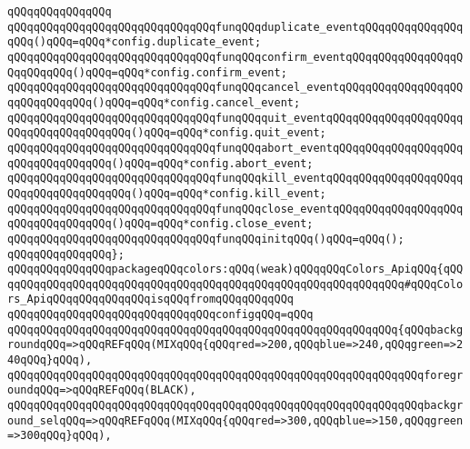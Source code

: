 \verb|qQQqqQQqqQQqqQQq|\newline
\verb|qQQqqQQqqQQqqQQqqQQqqQQqqQQqqQQqfunqQQqduplicate_eventqQQqqQQqqQQqqQQqqQQq()qQQq=qQQq*config.duplicate_event;|\newline
\verb|qQQqqQQqqQQqqQQqqQQqqQQqqQQqqQQqfunqQQqconfirm_eventqQQqqQQqqQQqqQQqqQQqqQQqqQQq()qQQq=qQQq*config.confirm_event;|\newline
\verb|qQQqqQQqqQQqqQQqqQQqqQQqqQQqqQQqfunqQQqcancel_eventqQQqqQQqqQQqqQQqqQQqqQQqqQQqqQQq()qQQq=qQQq*config.cancel_event;|\newline
\verb|qQQqqQQqqQQqqQQqqQQqqQQqqQQqqQQqfunqQQqquit_eventqQQqqQQqqQQqqQQqqQQqqQQqqQQqqQQqqQQqqQQq()qQQq=qQQq*config.quit_event;|\newline
\verb|qQQqqQQqqQQqqQQqqQQqqQQqqQQqqQQqfunqQQqabort_eventqQQqqQQqqQQqqQQqqQQqqQQqqQQqqQQqqQQq()qQQq=qQQq*config.abort_event;|\newline
\verb|qQQqqQQqqQQqqQQqqQQqqQQqqQQqqQQqfunqQQqkill_eventqQQqqQQqqQQqqQQqqQQqqQQqqQQqqQQqqQQqqQQq()qQQq=qQQq*config.kill_event;|\newline
\verb|qQQqqQQqqQQqqQQqqQQqqQQqqQQqqQQqfunqQQqclose_eventqQQqqQQqqQQqqQQqqQQqqQQqqQQqqQQqqQQq()qQQq=qQQq*config.close_event;|\newline
\newline
\verb|qQQqqQQqqQQqqQQqqQQqqQQqqQQqqQQqfunqQQqinitqQQq()qQQq=qQQq();|\newline
\verb|qQQqqQQqqQQqqQQq};|\newline
\newline
\verb|qQQqqQQqqQQqqQQqpackageqQQqcolors:qQQq(weak)qQQqqQQqColors_ApiqQQq{qQQqqQQqqQQqqQQqqQQqqQQqqQQqqQQqqQQqqQQqqQQqqQQqqQQqqQQqqQQqqQQq#qQQqColors_ApiqQQqqQQqqQQqqQQqisqQQqfromqQQqqQQqqQQq|\newline
\newline
\verb|qQQqqQQqqQQqqQQqqQQqqQQqqQQqqQQqconfigqQQq=qQQq|\newline
\verb|qQQqqQQqqQQqqQQqqQQqqQQqqQQqqQQqqQQqqQQqqQQqqQQqqQQqqQQqqQQq{qQQqbackgroundqQQq=>qQQqREFqQQq(MIXqQQq{qQQqred=>200,qQQqblue=>240,qQQqgreen=>240qQQq}qQQq),|\newline
\verb|qQQqqQQqqQQqqQQqqQQqqQQqqQQqqQQqqQQqqQQqqQQqqQQqqQQqqQQqqQQqqQQqforegroundqQQq=>qQQqREFqQQq(BLACK),|\newline
\verb|qQQqqQQqqQQqqQQqqQQqqQQqqQQqqQQqqQQqqQQqqQQqqQQqqQQqqQQqqQQqqQQqbackground_selqQQq=>qQQqREFqQQq(MIXqQQq{qQQqred=>300,qQQqblue=>150,qQQqgreen=>300qQQq}qQQq),|\newline
